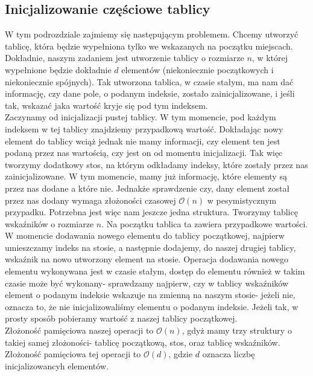 \documentclass[12pt,a4paper,titlepage]{article}
\newcommand\tab[1][1cm]{\hspace*{#1}}
\begin{document}
\subsection{Inicjalizowanie częściowe tablicy}
\tab[0.6cm]W tym podrozdziale zajmiemy się następującym problemem. Chcemy utworzyć tablicę, która będzie wypełniona tylko we wskazanych na początku miejscach. Dokładnie, naszym zadaniem jest utworzenie tablicy o rozmiarze $n$, w której wypełnione będzie dokładnie $d$ elementów (niekoniecznie początkowych i niekoniecznie spójnych). Tak utworzona tablica, w czasie stałym, ma nam dać informację, czy dane pole, o podanym indeksie, zostało zainicjalizowane, i jeśli tak, wskazać jaka wartość kryje się pod tym indeksem.\\
\tab[0.6cm]Zaczynamy od inicjalizacji pustej tablicy. W tym momencie, pod każdym indeksem w tej tablicy znajdziemy przypadkową wartość. Dokładając nowy element do tablicy wciąż jednak nie mamy informacji, czy element ten jest podaną przez nas wartością, czy jest on od momentu inicjalizacji. Tak więc tworzymy dodatkowy stos, na którym odkładamy indeksy, które zostały przez nas zainicjalizowane. W tym momencie, mamy już informację, które elementy są przez nas dodane a które nie. Jednakże sprawdzenie czy, dany element został przez nas dodany wymaga złożoności czasowej $\mathcal{O}(n)$ w pesymistycznym przypadku. Potrzebna jest więc nam jeszcze jedna struktura. Tworzymy tablicę wskaźników o rozmiarze $n$. Na początku tablica ta zawiera przypadkowe wartości. W momencie dodawania nowego elementu do tablicy początkowej, najpierw umieszczamy indeks na stosie, a następnie dodajemy, do naszej drugiej tablicy, wskaźnik na nowo utworzony element na stosie. Operacja dodawania nowego elementu wykonywana jest w czasie stałym, dostęp do elementu również w takim czasie może być wykonany- sprawdzamy najpierw, czy w tablicy wskaźników element o podanym indeksie wskazuje na zmienną na naszym stosie- jeżeli nie, oznacza to, że nie inicjalizowaliśmy elementu o podanym indeksie. Jeżeli tak, w prosty sposób pobieramy wartość z naszej tablicy początkowej.\\
\tab[0.6cm]Złożoność pamięciowa naszej operacji to $\mathcal{O}(n)$, gdyż mamy trzy struktury o takiej samej złożoności- tablicę początkową, stos, oraz tablicę wskaźników. Złożoność pamięciowa tej operacji to $\mathcal{O}(d)$, gdzie $d$ oznacza liczbę inicjalizowancyh elementów.
\end{document}
